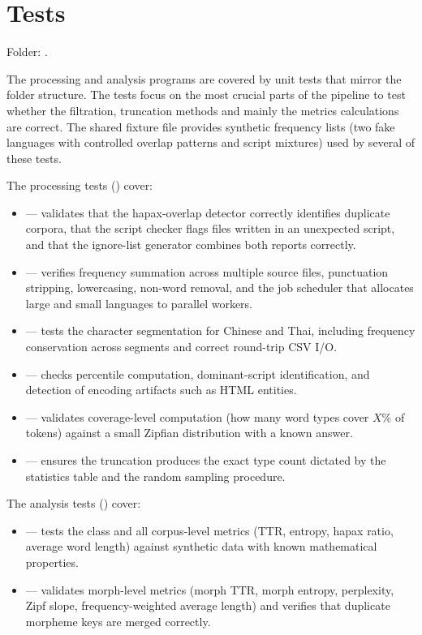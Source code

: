 \section{Tests}

Folder: .

The processing and analysis programs are covered by  unit tests that mirror the  folder structure. The tests focus on the most crucial parts of the pipeline to test whether the filtration, truncation methods and mainly the metrics calculations are correct. The shared fixture file  provides synthetic frequency lists (two fake languages with controlled overlap patterns and script mixtures) used by several of these tests.

The processing tests () cover:
\begin{itemize}
    \item {} --- validates that the hapax-overlap detector correctly identifies duplicate corpora, that the script checker flags files written in an unexpected script, and that the ignore-list generator combines both reports correctly.
    \item {} --- verifies frequency summation across multiple source files, punctuation stripping, lowercasing, non-word removal, and the job scheduler that allocates large and small languages to parallel workers.
    \item {} --- tests the character segmentation for Chinese and Thai, including frequency conservation across segments and correct round-trip CSV I/O.
    \item {} --- checks percentile computation, dominant-script identification, and detection of encoding artifacts such as HTML entities.
    \item {} --- validates coverage-level computation (how many word types cover $X$\% of tokens) against a small Zipfian distribution with a known answer.
    \item {} --- ensures the truncation produces the exact type count dictated by the statistics table and the random sampling procedure.
\end{itemize}

The analysis tests () cover:
\begin{itemize}
    \item {} --- tests the  class and all corpus-level metrics (TTR, entropy, hapax ratio, average word length) against synthetic data with known mathematical properties.
    \item {} --- validates morph-level metrics (morph TTR, morph entropy, perplexity, Zipf slope, frequency-weighted average length) and verifies that duplicate morpheme keys are merged correctly.
\end{itemize}

